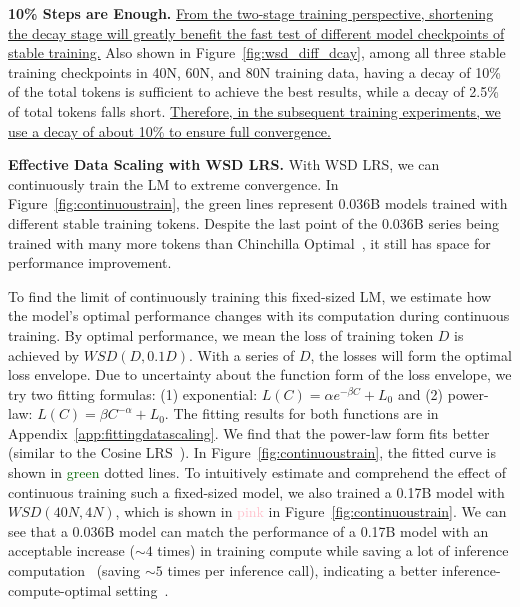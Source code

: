 \textbf{10\% Steps are Enough.} \uline{From the two-stage training perspective, shortening the decay stage will greatly benefit the fast test of different model checkpoints of stable training.} Also shown in Figure~\ref{fig:wsd_diff_dcay}, among all three stable training checkpoints in 40N, 60N, and 80N training data, having a decay of 10\% of the total tokens is sufficient to achieve the best results, while a decay of 2.5\% of total tokens falls short. \uline{Therefore, in the subsequent training experiments, we use a decay of about 10\% to ensure full convergence.}

\textbf{Effective Data Scaling with WSD LRS.} With WSD LRS, we can continuously train the LM to extreme convergence. In Figure~\ref{fig:continuoustrain}, the green lines represent 0.036B models trained with different stable training tokens. Despite the last point of the 0.036B series being trained with many more tokens than Chinchilla Optimal~\citep{hoffmann2022training}, it still has space for performance improvement. 


To find the limit of continuously training this fixed-sized LM, we estimate how the model's optimal performance changes with its computation during continuous training. By optimal performance, we mean the loss of training token $D$ is achieved by ${WSD}(D, 0.1D)$. With a series of $D$, the losses will form the optimal loss envelope. Due to uncertainty about the function form of the loss envelope, we try two fitting formulas: (1) exponential: $L(C) = \alpha e^{-\beta C} + L_0$ and (2) power-law: $L(C) = \beta C^{-\alpha} + L_0$. The fitting results for both functions are in Appendix~\ref{app:fittingdatascaling}. We find that the power-law form fits better (similar to the Cosine LRS~\citep{kaplan2020scaling}). In Figure~\ref{fig:continuoustrain}, the fitted curve is shown in \textcolor{darkgreen}{green} dotted lines. To intuitively estimate and comprehend the effect of continuous training such a fixed-sized model, we also trained a 0.17B model with $WSD(40N, 4N)$, which is shown in \textcolor{pink}{pink} in Figure~\ref{fig:continuoustrain}.  We can see that a 0.036B model can match the performance of a 0.17B model with an acceptable increase ($\sim 4$ times) in training compute while saving a lot of inference computation~\citep{sardana2023beyond} (saving $\sim 5$ times per inference call), indicating a better inference-compute-optimal setting~\citep{sardana2023beyond}.




